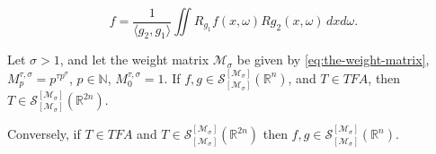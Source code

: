 \documentclass[10pt,a4paper]{amsart}
\begin{document}
\begin{equation} \label{eq:inversion}
f = \frac{1}{\langle g_2, g_1 \rangle} \iint  R_{g_1} f (x, \omega)
R g_2 (x,\omega) \, dx d\omega.
\end{equation}

\begin{Theorem} \label{nec-suf-cond}
Let $\sigma>1$, and let the weight matrix $\mathcal{M}_\sigma$ be given by 
\eqref{eq:the-weight-matrix}, 
$ M_{p}^{\tau,\sigma}=p^{\tau p^\sigma}$, $ p\in \mathbb{N}$, $ M_0^{\tau,\sigma}=1$.
If $f,g \in    \mathcal S_{[\mathcal{M}_\sigma ]}^{[\mathcal{M}_\sigma]} (\mathbb R^{n}) $, 
and  $ T \in TFA$, then $ T   \in   \mathcal S_{[\mathcal{M}_\sigma ]}^{[\mathcal{M}_\sigma]} (\mathbb R^{2n})$.

Conversely, if  $ T \in TFA$ and $ T   \in   \mathcal S_{[\mathcal{M}_\sigma ]}^{[\mathcal{M}_\sigma]} (\mathbb R^{2n})$
then $f,g \in     \mathcal S_{[\mathcal{M}_\sigma ]}^{[\mathcal{M}_\sigma]} (\mathbb R^{n}).$
\end{Theorem}
\end{document}
